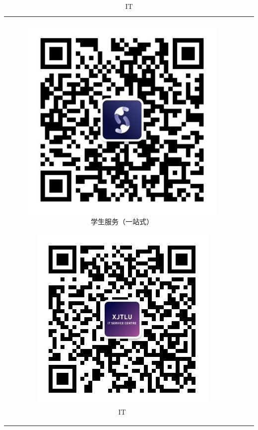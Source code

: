 \begin{table}[H]
\begin{tabular}{ccc}
\begin{subfigure}{0.25\columnwidth}
        \end{subfigure} \hfill
        \begin{subfigure}{0.25\columnwidth}
            \includegraphics[width=\linewidth]{author-folder/Kai.Wu/qrcode_student_service.jpg} \caption{学生服务（一站式）}
        \end{subfigure} \hfill
        \begin{subfigure}{0.25\columnwidth}
            \includegraphics[width=\linewidth]{author-folder/Kai.Wu/qrcode_IT.jpg} \caption{IT}
        \end{subfigure} \hfill
    \end{tabular}
\end{table}

